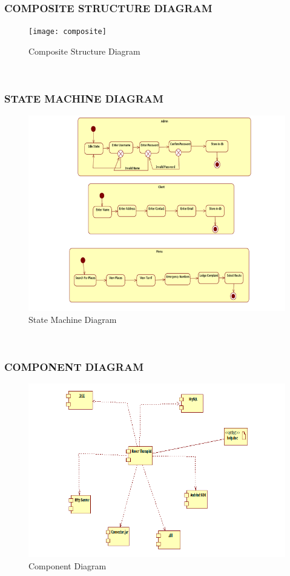 \documentclass[12pt,a4paper]{article}
\begin{document}
\subsubsection{COMPOSITE STRUCTURE DIAGRAM}
\begin{figure}[!htb]
\centering
\texttt{[image: composite]}
\caption{Composite Structure Diagram}
\end{figure}
\\
\newpage
\subsubsection{STATE MACHINE DIAGRAM}
\begin{figure}[!htb]
\centering
\includegraphics[width=15 cm]{state}
\caption{State Machine Diagram}
\end{figure}
\\
\newpage
\subsubsection{COMPONENT DIAGRAM}
\begin{figure}[!htb]
\centering
\includegraphics[width=15 cm]{component}
\caption{Component Diagram}
\end{figure}
\\
\newpage
\end{document}
